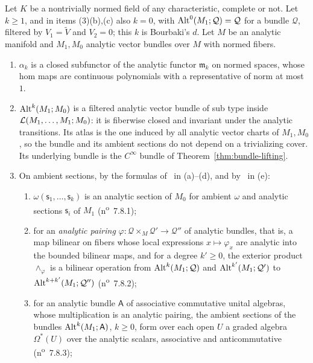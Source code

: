 \begin{theorem}\label{amb:thm:seven-eight}
Let $K$ be a nontrivially normed field of any characteristic, complete or not. Let $k\ge1$, and in items \textup{(3)(b),(c)} also $k=0$, with $\operatorname{Alt}^0(M_1;\mathcal Q)=\mathcal Q$ for a bundle $\mathcal Q$, filtered by $V_1=\tilde V$ and $V_2=0$; this $k$ is Bourbaki's $d$. Let $M$ be an analytic manifold and $M_1,M_0$ analytic vector bundles over $M$ with normed fibers.
\begin{enumerate}
\item $\alpha_k$ is a closed subfunctor of the analytic functor $\mathfrak m_k$ on normed spaces, whose hom maps are continuous polynomials with a representative of norm at most $1$.
\item $\operatorname{Alt}^k(M_1;M_0)$ is a filtered analytic vector bundle of sub type inside $\mathcal L(M_1,\dots,M_1;M_0)$: it is fiberwise closed and invariant under the analytic transitions. Its atlas is the one induced by all analytic vector charts of $M_1,M_0$, so the bundle and its ambient sections do not depend on a trivializing cover. Its underlying bundle is the $C^\infty$ bundle of Theorem~\ref{thm:bundle-lifting}.
\item On ambient sections, by the formulas of~\cite[n\textsuperscript{o}~7.8]{Bou} in \textup{(a)--(d)}, and by~\cite[n\textsuperscript{o}~7.6.3]{Bou} in \textup{(e)}:
\begin{enumerate}
\item $\omega(\mathsf s_1,\dots,\mathsf s_k)$ is an analytic section of $M_0$ for ambient $\omega$ and analytic sections $\mathsf s_i$ of $M_1$ (n\textsuperscript{o}~7.8.1);
\item for an \emph{analytic pairing} $\varphi\colon\mathcal Q\times_M\mathcal Q'\to\mathcal Q''$ of analytic bundles, that is, a map bilinear on fibers whose local expressions $x\mapsto\varphi_x$ are analytic into the bounded bilinear maps, and for a degree $k'\ge0$, the exterior product $\wedge_\varphi$ is a bilinear operation from $\operatorname{Alt}^k(M_1;\mathcal Q)$ and $\operatorname{Alt}^{k'}(M_1;\mathcal Q')$ to $\operatorname{Alt}^{k+k'}(M_1;\mathcal Q'')$ (n\textsuperscript{o}~7.8.2);
\item for an analytic bundle $\mathsf A$ of associative commutative unital algebras, whose multiplication is an analytic pairing, the ambient sections of the bundles $\operatorname{Alt}^k(M_1;\mathsf A)$, $k\ge0$, form over each open $U$ a graded algebra $\Omega^*(U)$ over the analytic scalars, associative and anticommutative (n\textsuperscript{o}~7.8.3);

\end{enumerate}
\end{enumerate}
\end{theorem}
